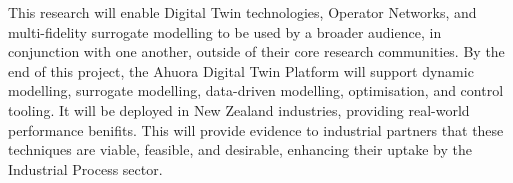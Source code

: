 \documentclass[12pt]{article}
\begin{document}
This research will enable Digital Twin technologies, Operator Networks, and multi-fidelity surrogate modelling to be used by a broader audience, in conjunction with one another, outside of their core research communities.
By the end of this project, the Ahuora Digital Twin Platform will support dynamic modelling, surrogate modelling, data-driven modelling, optimisation, and control tooling. It will be deployed in New Zealand industries, providing real-world performance benifits. This will provide evidence to industrial partners that these techniques are viable, feasible, and desirable, enhancing their uptake by the Industrial Process sector.












\end{document}
